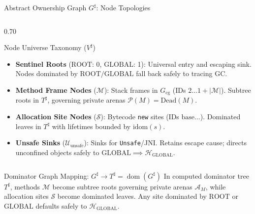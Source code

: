 \documentclass[11pt]{beamer}
\providecommand{\ROOT}{\text{ROOT}}
\providecommand{\GLOBAL}{\text{GLOBAL}}
\providecommand{\dom}{\mathrel{\text{dom}}}
\providecommand{\idom}{\text{idom}}
\begin{document}
\begin{frame}{Abstract Ownership Graph $G^\sharp$: Node Topologies}
\begin{columns}[c]
    \begin{column}{0.70\textwidth}
      \begin{block}{Node Universe Taxonomy ($V^\sharp$)}
        \scriptsize
        \begin{itemize}\setlength{\itemsep}{1.1pt}\setlength{\topsep}{0pt}\setlength{\partopsep}{0pt}\setlength{\parskip}{0pt}\setlength{\parsep}{0pt}
          \item \textbf{Sentinel Roots} ($\ROOT$: 0, $\GLOBAL$: 1): Universal entry and escaping sink. Nodes dominated by $\ROOT/\GLOBAL$ fall back safely to tracing GC.
          \item \textbf{Method Frame Nodes} ($\mathcal{M}$): Stack frames in $G_{\text{cg}}$ (IDs $2 \dots 1+|\mathcal{M}|$). Subtree roots in $T^\sharp$, governing private arenas $\mathcal{P}(M) = \text{Dead}(M)$.
          \item \textbf{Allocation Site Nodes} ($\mathcal{S}$): Bytecode \texttt{new} sites (IDs $\text{base} \dots$). Dominated leaves in $T^\sharp$ with lifetimes bounded by $\idom(s)$.
          \item \textbf{Unsafe Sinks} ($\mathcal{U}_{\text{unsafe}}$): Sinks for \texttt{Unsafe}/JNI. Retains escape cause; directs unconfined objects safely to $\GLOBAL \implies \mathcal{H}_{\GLOBAL}$.
        \end{itemize}
      \end{block}
    \end{column}
  \end{columns}
  \vspace{-0.5em}
  \begin{alertblock}{Dominator Graph Mapping: $G^\sharp \to T^\sharp = \dom(G^\sharp)$}
    \scriptsize
    In computed dominator tree $T^\sharp$, methods $\mathcal{M}$ become subtree roots governing private arenas $\mathcal{A}_M$, while allocation sites $\mathcal{S}$ become dominated leaves. Any site dominated by $\ROOT$ or $\GLOBAL$ defaults safely to $\mathcal{H}_{\GLOBAL}$.
  \end{alertblock}
\end{frame}
\endgroup
\end{document}
